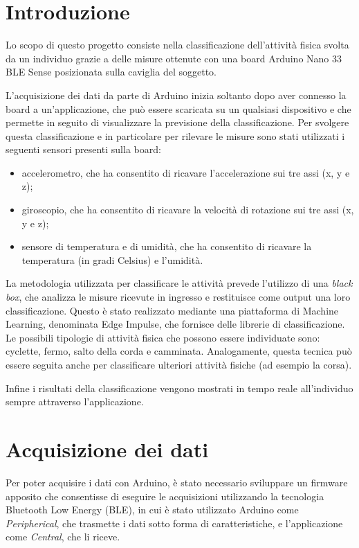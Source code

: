 \section{Introduzione}
Lo scopo di questo progetto consiste nella classificazione dell'attività fisica svolta da un individuo grazie a delle misure ottenute con una board Arduino Nano 33 BLE Sense posizionata sulla caviglia del soggetto. 




L'acquisizione dei dati da parte di Arduino inizia soltanto dopo aver connesso la board a un'applicazione, che può essere scaricata su un qualsiasi dispositivo e che permette in seguito di visualizzare la previsione della classificazione. Per svolgere questa classificazione e in particolare per rilevare le misure sono stati utilizzati i seguenti sensori presenti sulla board:
\begin{itemize}
	\item accelerometro, che ha consentito di ricavare l'accelerazione sui tre assi (x, y e z);
	\item giroscopio, che ha consentito di ricavare la velocità di rotazione sui tre assi (x, y e z);
	\item sensore di temperatura e di umidità, che ha consentito di ricavare la temperatura (in gradi Celsius) e l'umidità.
\end{itemize}

La metodologia utilizzata per classificare le attività prevede l'utilizzo di una \textit{black box}, che analizza le misure ricevute in ingresso e restituisce come output una loro classificazione. Questo è stato realizzato mediante una piattaforma di Machine Learning, denominata Edge Impulse, che fornisce delle librerie di classificazione. Le possibili tipologie di attività fisica che possono essere individuate sono: cyclette, fermo, salto della corda e camminata. Analogamente, questa tecnica può essere seguita anche per classificare ulteriori attività fisiche (ad esempio la corsa).

Infine i risultati della classificazione vengono mostrati in tempo reale all'individuo sempre attraverso l'applicazione.

\section{Acquisizione dei dati}
Per poter acquisire i dati con Arduino, è stato necessario sviluppare un firmware apposito che consentisse di eseguire le acquisizioni utilizzando la tecnologia Bluetooth Low Energy (BLE), in cui è stato utilizzato Arduino come \textit{Peripherical}, che trasmette i dati sotto forma di caratteristiche, e l'applicazione come \textit{Central}, che li riceve. 

